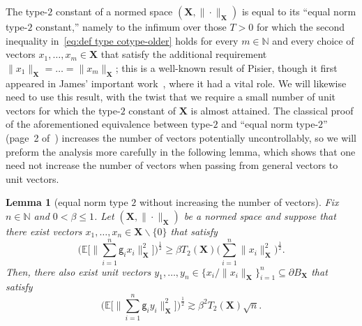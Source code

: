 \documentclass[11pt,reqno]{amsart}
\renewcommand{\le}{\leqslant}
\renewcommand{\ge}{\geqslant}
\renewcommand{\setminus}{\smallsetminus}
\newcommand{\X}{\mathbf X}
\newtheorem{lemma}[theorem]{Lemma}
\theoremstyle{remark}
\renewcommand{\subset}{\subseteq}
\newcommand{\E}{\mathbb{ E}}
\newcommand{\N}{\mathbb N}
\renewcommand{\1}{\mathbf 1}
\newcommand{\g}{\mathsf{g}}
\begin{document}
The type-$2$ constant of a normed space $(\X,\|\cdot\|_\X)$ is equal to its ``equal norm type-$2$ constant,'' namely to the infimum over those $T>0$ for which the second inequality in~\eqref{eq:def type cotype-older} holds for every $m\in \N$ and every choice of vectors $x_1,\ldots,x_m\in \X$ that satisfy the additional requirement $\|x_1\|_\X=\ldots=\|x_m\|_\X$; this is a well-known result of  Pisier, though it first appeared in James' important work~\cite{Jam78}, where it had a vital role. We will likewise  need to use this result, with the  twist that we require a small number of unit vectors for which the type-$2$ constant of $\X$ is almost attained. The classical proof of the aforementioned equivalence between  type-$2$ and ``equal norm type-$2$''  (page~2 of~\cite{Jam78}) increases the number of vectors potentially uncontrollably, so we will preform the analysis more carefully in the following lemma, which shows that one need not increase the number of vectors when passing from general vectors to unit vectors.


\begin{lemma}[equal norm type $2$ without increasing the number of vectors]\label{lem:equal norm} Fix $n\in \N$ and $0<\beta\le 1$. Let $(\X,\|\cdot\|_\X)$ be a normed space and suppose that there exist vectors $x_1,\ldots,x_n\in \X\setminus\{0\}$ that satisfy
\begin{equation}\label{eq:saturation type assumption}
\Bigg(\E\bigg[\Big\|\sum_{i=1}^n \g_i x_i\Big\|_\X^2\bigg]\Bigg)^{\frac12}\ge \beta T_2(\X) \bigg(\sum_{i=1}^n \|x_i\|_\X^2\bigg)^{\frac12}.
\end{equation}
Then, there also exist unit vectors  $y_1,\ldots,y_n\in \{x_i/\|x_i\|_\X\}_{i=1}^n\subset \partial B_\X$ that satisfy
\begin{equation}\label{eq:equal norm type two conclusion in lemma}
\Bigg(\E\bigg[\Big\|\sum_{i=1}^n \g_i y_i\Big\|_\X^2\bigg]\Bigg)^{\frac12}\gtrsim \beta^2T_2(\X)\sqrt{n}.
\end{equation}
\end{lemma}
\end{document}
